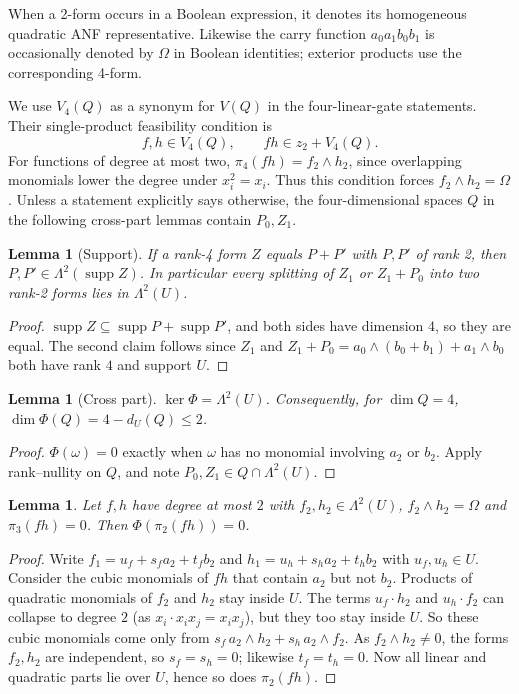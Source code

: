 \documentclass[11pt,a4paper]{article}
\theoremstyle{plain}
\newtheorem{lemma}[theorem]{Lemma}
\theoremstyle{remark}
\newcommand{\supp}{\operatorname{supp}}
\newcommand{\Lam}{\Lambda^2}
\newcommand{\dU}{d_U}
\begin{document}
When a 2-form occurs in a Boolean expression, it denotes its homogeneous quadratic ANF representative. Likewise the carry function $a_0a_1b_0b_1$ is occasionally denoted by $\Omega$ in Boolean identities; exterior products use the corresponding 4-form.

We use $V_4(Q)$ as a synonym for $V(Q)$ in the four-linear-gate statements. Their single-product feasibility condition is
\begin{equation}\label{l4:eq:star}
 f,h\in V_4(Q),\qquad fh\in z_2+V_4(Q).
\end{equation}
For functions of degree at most two, $\pi_4(fh)=f_2\wedge h_2$, since overlapping monomials lower the degree under $x_i^2=x_i$. Thus this condition forces $f_2\wedge h_2=\Omega$.
Unless a statement explicitly says otherwise, the four-dimensional spaces $Q$ in the following cross-part lemmas contain $P_0,Z_1$.

\begin{lemma}[Support]\label{l4:lem:support}
If a rank-4 form $Z$ equals $P+P'$ with $P,P'$ of rank 2, then $P,P'\in\Lam(\supp Z)$. In particular every splitting of $Z_1$ or $Z_1+P_0$ into two rank-2 forms lies in $\Lam(U)$.
\end{lemma}

\begin{proof}
$\supp Z\subseteq\supp P+\supp P'$, and both sides have dimension $4$, so they are equal. The second claim follows since $Z_1$ and $Z_1+P_0=a_0\wedge(b_0+b_1)+a_1\wedge b_0$ both have rank $4$ and support $U$.
\end{proof}

\begin{lemma}[Cross part]\label{l4:lem:cross}
$\ker\Phi=\Lam(U)$. Consequently, for $\dim Q=4$, $\dim\Phi(Q)=4-\dU(Q)\le 2$.
\end{lemma}

\begin{proof}
$\Phi(\omega)=0$ exactly when $\omega$ has no monomial involving $a_2$ or $b_2$. Apply rank--nullity on $Q$, and note $P_0,Z_1\in Q\cap\Lam(U)$.
\end{proof}

\begin{lemma}\label{l4:lem:planeU}
Let $f,h$ have degree at most $2$ with $f_2,h_2\in\Lam(U)$, $f_2\wedge h_2=\Omega$ and $\pi_3(fh)=0$. Then $\Phi(\pi_2(fh))=0$.
\end{lemma}

\begin{proof}
Write $f_1=u_f+s_fa_2+t_fb_2$ and $h_1=u_h+s_ha_2+t_hb_2$ with $u_f,u_h\in U$. Consider the cubic monomials of $fh$ that contain $a_2$ but not $b_2$. Products of quadratic monomials of $f_2$ and $h_2$ stay inside $U$. The terms $u_f\cdot h_2$ and $u_h\cdot f_2$ can collapse to degree $2$ (as $x_i\cdot x_ix_j=x_ix_j$), but they too stay inside $U$. So these cubic monomials come only from $s_f\,a_2\wedge h_2+s_h\,a_2\wedge f_2$. As $f_2\wedge h_2\ne0$, the forms $f_2,h_2$ are independent, so $s_f=s_h=0$; likewise $t_f=t_h=0$. Now all linear and quadratic parts lie over $U$, hence so does $\pi_2(fh)$.
\end{proof}
\end{document}
